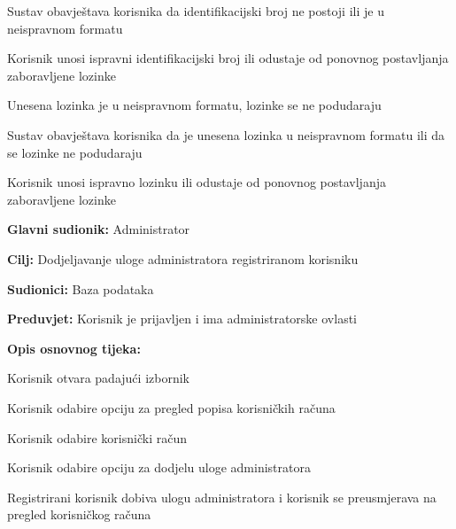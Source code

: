 \begin{packed_item}
\begin{packed_item}
\begin{packed_enum}
			\item Sustav obavještava korisnika da identifikacijski broj ne postoji ili je u neispravnom formatu
			\item Korisnik unosi ispravni identifikacijski broj ili odustaje od ponovnog postavljanja zaboravljene lozinke

		\end{packed_enum}
		\item[5.a] Unesena lozinka je u neispravnom formatu, lozinke se ne podudaraju
		\item[] \begin{packed_enum}

			\item Sustav obavještava korisnika da je unesena lozinka u neispravnom formatu ili da se lozinke ne podudaraju
			\item Korisnik unosi ispravno lozinku ili odustaje od ponovnog postavljanja zaboravljene lozinke

		\end{packed_enum}
	\end{packed_item}
\end{packed_item}


\noindent {}
\begin{packed_item}

	\item \textbf{Glavni sudionik: }Administrator
	\item  \textbf{Cilj:} Dodjeljavanje uloge administratora registriranom korisniku
	\item  \textbf{Sudionici:} Baza podataka
	\item  \textbf{Preduvjet:} Korisnik je prijavljen i ima administratorske ovlasti
	\item  \textbf{Opis osnovnog tijeka:}

	\item[] \begin{packed_enum}

		\item Korisnik otvara padajući izbornik 
		\item Korisnik odabire opciju za pregled popisa korisničkih računa
		\item Korisnik odabire korisnički račun
		\item Korisnik odabire opciju za dodjelu uloge administratora
		\item Registrirani korisnik dobiva ulogu administratora i korisnik se preusmjerava na pregled korisničkog računa
	\end{packed_enum}
\end{packed_item}


